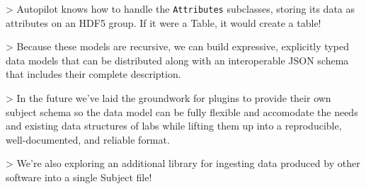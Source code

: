 > Autopilot knows how to handle the \texttt{Attributes} subclasses, storing its data as attributes on an HDF5 group. If it were a Table, it would create a table!

> Because these models are recursive, we can build expressive, explicitly typed data models that can be distributed along with an interoperable JSON schema that includes their complete description. 

> In the future we've laid the groundwork for plugins to provide their own subject schema so the data model can be fully flexible and accomodate the needs and existing data structures of labs while lifting them up into a reproducible, well-documented, and reliable format.

> We're also exploring an additional library for ingesting data produced by other software into a single Subject file!



